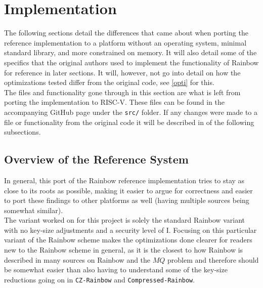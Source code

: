 \section{Implementation}
The following sections detail the differences that came about when porting the reference implementation \cite{rainbowgit} to a platform without an operating system, minimal standard library, and more constrained on memory. It will also detail some of the specifics that the original authors used to implement the functionality of Rainbow for reference in later sections. It will, however, not go into detail on how the optimizations tested differ from the original code, see \cref{opti} for this.
\medskip\\
The files and functionality gone through in this section are what is left from porting the implementation to RISC-V. These files can be found in the accompanying GitHub page under the \texttt{src/} folder. If any changes were made to a file or functionality from the original code it will be described in of the following subsections.
\subsection{Overview of the Reference System}
In general, this port of the Rainbow reference implementation tries to stay as close to its roots as possible, making it easier to argue for correctness and easier to port these findings to other platforms as well (having multiple sources being somewhat similar).
\medskip\\
The variant worked on for this project is solely the standard Rainbow variant with no key-size adjustments and a security level of I. Focusing on this particular variant of the Rainbow scheme makes the optimizations done clearer for readers new to the Rainbow scheme in general, as it is the closest to how Rainbow is described in many sources on Rainbow and the $MQ$ problem and therefore should be somewhat easier than also having to understand some of the key-size reductions going on in \texttt{CZ-Rainbow} and \texttt{Compressed-Rainbow}.
